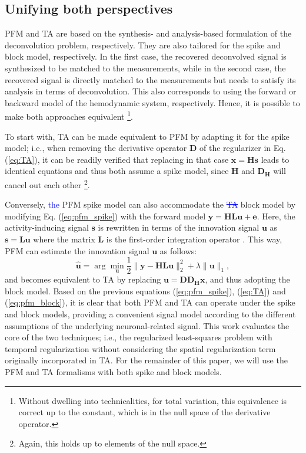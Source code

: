 \subsection{Unifying both perspectives}
\label{sec:unifying_both_perspectives}
PFM and TA are based on the synthesis- and analysis-based formulation of the
deconvolution problem, respectively. They are also tailored for the spike and
block model, respectively. In the first case, the recovered deconvolved signal
is synthesized to be matched to the measurements, while in the second case, the
recovered signal is directly matched to the measurements but needs to satisfy
its analysis in terms of deconvolution. This also corresponds to using the
forward or backward model of the hemodynamic system, respectively. Hence, it is
possible to make both approaches equivalent
\citep{Elad2007Analysisversussynthesis}\footnote{Without dwelling into
technicalities, for total variation, this equivalence is correct up to the
constant, which is in the null space of the derivative operator.}.

To start with, TA can be made equivalent to PFM by adapting it for the spike
model; i.e., when removing the derivative operator $\mathbf{D}$ of the
regularizer in Eq. (\ref{eq:TA}), it can be readily verified that replacing in
that case $\mathbf{x}=\mathbf{Hs}$ leads to identical equations and thus both
assume a spike model, since $\mathbf{H}$ and $\mathbf{D_H}$ will cancel out each
other \citep{Karahanoglu2011SignalProcessingApproach}\footnote{Again, this holds
up to elements of the null space.}.

Conversely, \textcolor{blue}{the} PFM spike model can also accommodate the
\textcolor{blue}{\sout{TA}} block model by modifying Eq. (\ref{eq:pfm_spike})
with the forward model $\mathbf{y} = \mathbf{H L u} + \mathbf{e}$. Here, the
activity-inducing signal $\mathbf{s}$ is rewritten in terms of the innovation
signal $\mathbf{u}$ as $\mathbf{s}=\mathbf{Lu}$ where the matrix $\mathbf{L}$ is
the first-order integration operator
\citep{Cherkaoui2019SparsitybasedBlind,Urunuela2020StabilityBasedSparse}. This
way, PFM can estimate the innovation signal $\mathbf{u}$ as follows: 
\begin{equation}
    \label{eq:pfm_block}
    \hat{\mathbf{u}} = \arg \min_{\mathbf{u}} \frac{1}{2} \| \mathbf{y} - \mathbf{HLu} \|_2^2 + \lambda \| \mathbf{u} \|_1,
\end{equation}
and becomes equivalent to TA by replacing $\mathbf{u}=\mathbf{D D_H x}$, and
thus adopting the block model. Based on the previous equations
(\ref{eq:pfm_spike}), (\ref{eq:TA}) and (\ref{eq:pfm_block}), it is clear that
both PFM and TA can operate under the spike and block models, providing a
convenient signal model according to the different assumptions of the underlying
neuronal-related signal. This work evaluates the core of the two techniques;
i.e., the regularized least-squares problem with temporal regularization without
considering the spatial regularization term originally incorporated in TA. For
the remainder of this paper, we will use the PFM and TA formalisms with both
spike and block models. 

